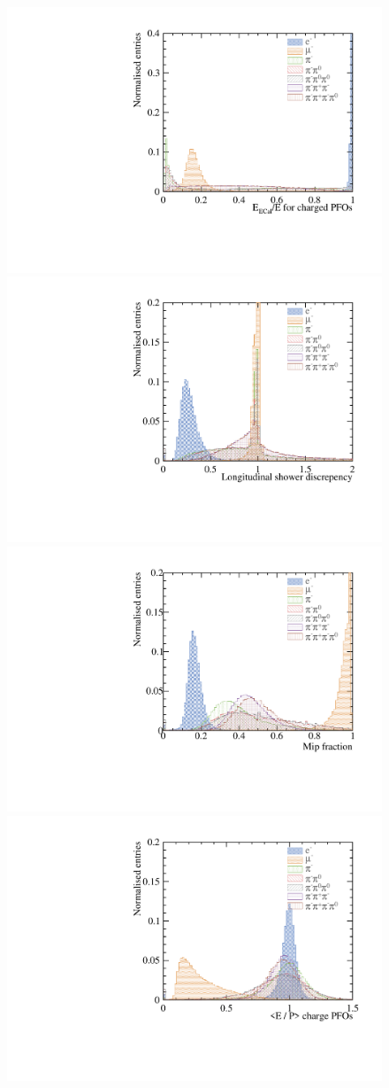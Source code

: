 \documentclass[a4paper,11pt]{article}
\begin{document}
\begin{figure}[htbp]
\centering %
\includegraphics[width=.45\textwidth]{plots/var/EEHCalRatio_100GeV_improved}
\qquad
\includegraphics[width=.45\textwidth]{plots/var/profileDiscrepency_100GeV_improved} 
\qquad
\includegraphics[width=.45\textwidth]{plots/var/mipFraction_100GeV_improved} 
\qquad
\includegraphics[width=.45\textwidth]{plots/var/eOverPCharge_100GeV_improved}


\end{figure}
\end{document}
